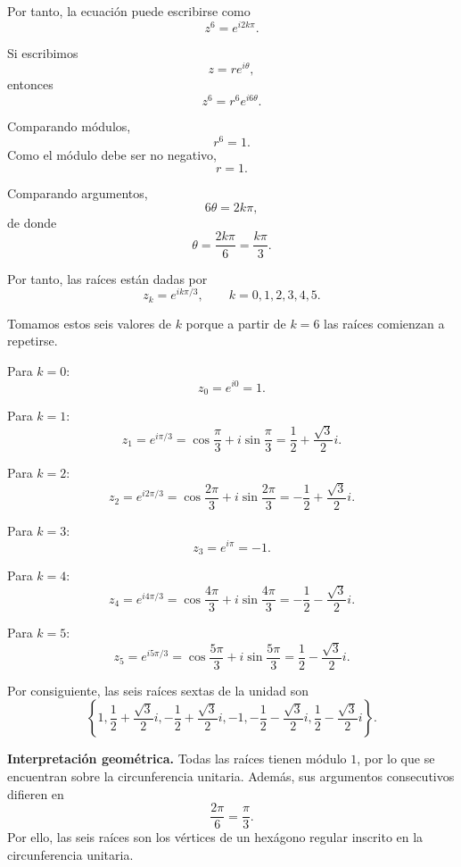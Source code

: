 Por tanto, la ecuación puede escribirse como
\[
z^6=e^{i2k\pi}.
\]

Si escribimos
\[
z=re^{i\theta},
\]
entonces
\[
z^6=r^6e^{i6\theta}.
\]

Comparando módulos,
\[
r^6=1.
\]
Como el módulo debe ser no negativo,
\[
r=1.
\]

Comparando argumentos,
\[
6\theta=2k\pi,
\]
de donde
\[
\theta=\frac{2k\pi}{6}
=
\frac{k\pi}{3}.
\]

Por tanto, las raíces están dadas por
\[
\boxed{
z_k=e^{ik\pi/3}
},
\qquad
k=0,1,2,3,4,5.
\]

Tomamos estos seis valores de $k$ porque a partir de $k=6$ las raíces
comienzan a repetirse.

Para $k=0$:
\[
z_0=e^{i0}=1.
\]

Para $k=1$:
\[
z_1=e^{i\pi/3}
=
\cos\frac{\pi}{3}
+i\sin\frac{\pi}{3}
=
\frac12+\frac{\sqrt3}{2}i.
\]

Para $k=2$:
\[
z_2=e^{i2\pi/3}
=
\cos\frac{2\pi}{3}
+i\sin\frac{2\pi}{3}
=
-\frac12+\frac{\sqrt3}{2}i.
\]

Para $k=3$:
\[
z_3=e^{i\pi}
=
-1.
\]

Para $k=4$:
\[
z_4=e^{i4\pi/3}
=
\cos\frac{4\pi}{3}
+i\sin\frac{4\pi}{3}
=
-\frac12-\frac{\sqrt3}{2}i.
\]

Para $k=5$:
\[
z_5=e^{i5\pi/3}
=
\cos\frac{5\pi}{3}
+i\sin\frac{5\pi}{3}
=
\frac12-\frac{\sqrt3}{2}i.
\]

Por consiguiente, las seis raíces sextas de la unidad son
\[
\boxed{
\left\{
1,
\frac12+\frac{\sqrt3}{2}i,
-\frac12+\frac{\sqrt3}{2}i,
-1,
-\frac12-\frac{\sqrt3}{2}i,
\frac12-\frac{\sqrt3}{2}i
\right\}
}.
\]

\medskip

\noindent
\textbf{Interpretación geométrica.}
Todas las raíces tienen módulo $1$, por lo que se encuentran sobre la
circunferencia unitaria. Además, sus argumentos consecutivos difieren en
\[
\frac{2\pi}{6}=\frac{\pi}{3}.
\]
Por ello, las seis raíces son los vértices de un hexágono regular inscrito
en la circunferencia unitaria.

